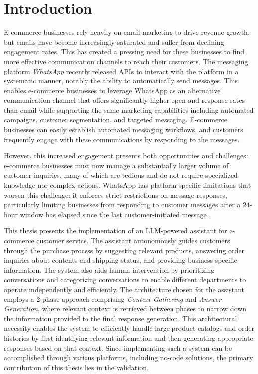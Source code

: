 \chapter{Introduction}
\label{cha:introduction}



E-commerce businesses rely heavily on email marketing to drive revenue growth, but emails have become increasingly saturated and suffer from declining engagement rates.
This has created a pressing need for these businesses to find more effective communication channels to reach their customers.
The messaging platform \textit{WhatsApp} recently released APIs to interact with the platform in a systematic manner, notably the ability to automatically send messages.
This enables e-commerce businesses to leverage WhatsApp as an alternative communication channel that offers significantly higher open and response rates than email while supporting the same marketing capabilities including automated campaigns, customer segmentation, and targeted messaging.
E-commerce businesses can easily establish automated messaging workflows, and customers frequently engage with these communications by responding to the messages.


However, this increased engagement presents both opportunities and challenges: e-commerce businesses must now manage a substantially larger volume of customer inquiries, many of which are tedious and do not require specialized knowledge nor complex actions.
WhatsApp has platform-specific limitations that worsen this challenge: it enforces strict restrictions on message responses, particularly limiting businesses from responding to customer messages after a 24-hour window has elapsed since the last customer-initiated message \cite{wa_policy}.


This thesis presents the implementation of an LLM-powered assistant for e-commerce customer service.
The assistant autonomously guides customers through the purchase process by suggesting relevant products, answering order inquiries about contents and shipping status, and providing business-specific information.
The system also aids human intervention by prioritizing conversations and categorizing conversations to enable different departments to operate independently and efficiently.
The architecture chosen for the assistant employs a 2-phase approach comprising \textit{Context Gathering} and \textit{Answer Generation}, where relevant context is retrieved between phases to narrow down the information provided to the final response generation.
This architectural necessity enables the system to efficiently handle large product catalogs and order histories by first identifying relevant information and then generating appropriate responses based on that context.
Since implementing such a system can be accomplished through various platforms, including no-code solutions, the primary contribution of this thesis lies in the validation.

